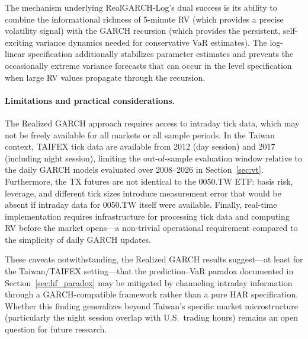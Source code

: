 The mechanism underlying RealGARCH-Log's dual success is its ability to combine the informational richness of 5-minute RV (which provides a precise volatility signal) with the GARCH recursion (which provides the persistent, self-exciting variance dynamics needed for conservative VaR estimates). The log-linear specification additionally stabilizes parameter estimates and prevents the occasionally extreme variance forecasts that can occur in the level specification when large RV values propagate through the recursion.

\paragraph{Limitations and practical considerations.} The Realized GARCH approach requires access to intraday tick data, which may not be freely available for all markets or all sample periods. In the Taiwan context, TAIFEX tick data are available from 2012 (day session) and 2017 (including night session), limiting the out-of-sample evaluation window relative to the daily GARCH models evaluated over 2008--2026 in Section~\ref{sec:vt}. Furthermore, the TX futures are not identical to the 0050.TW ETF: basis risk, leverage, and different tick sizes introduce measurement error that would be absent if intraday data for 0050.TW itself were available. Finally, real-time implementation requires infrastructure for processing tick data and computing RV before the market opens---a non-trivial operational requirement compared to the simplicity of daily GARCH updates.

These caveats notwithstanding, the Realized GARCH results suggest---at least for the Taiwan/TAIFEX setting---that the prediction--VaR paradox documented in Section~\ref{sec:hf_paradox} may be mitigated by channeling intraday information through a GARCH-compatible framework rather than a pure HAR specification. Whether this finding generalizes beyond Taiwan's specific market microstructure (particularly the night session overlap with U.S.\ trading hours) remains an open question for future research.
